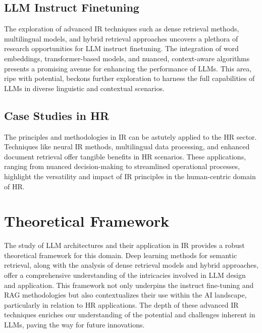 \documentclass{article}
\begin{document}
\subsection{LLM Instruct Finetuning}

The exploration of advanced IR techniques such as dense retrieval methods, multilingual models, and hybrid retrieval approaches uncovers a plethora of research opportunities for LLM instruct finetuning. The integration of word embeddings, transformer-based models, and nuanced, context-aware algorithms presents a promising avenue for enhancing the performance of LLMs. This area, ripe with potential, beckons further exploration to harness the full capabilities of LLMs in diverse linguistic and contextual scenarios.


\subsection{Case Studies in HR}

The principles and methodologies in IR can be astutely applied to the HR sector. Techniques like neural IR methods, multilingual data processing, and enhanced document retrieval offer tangible benefits in HR scenarios. These applications, ranging from nuanced decision-making to streamlined operational processes, highlight the versatility and impact of IR principles in the human-centric domain of HR.

\section{Theoretical Framework}

The study of LLM architectures and their application in IR provides a robust theoretical framework for this domain. Deep learning methods for semantic retrieval, along with the analysis of dense retrieval models and hybrid approaches, offer a comprehensive understanding of the intricacies involved in LLM design and application. This framework not only underpins the instruct fine-tuning and RAG methodologies but also contextualizes their use within the AI landscape, particularly in relation to HR applications. The depth of these advanced IR techniques enriches our understanding of the potential and challenges inherent in LLMs, paving the way for future innovations.
\end{document}
